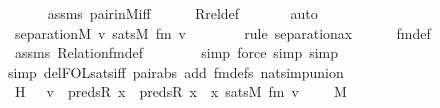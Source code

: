 \begin{isabellebody}
\ \ \ \ \isamarkupfalse%
\ assms\ pair{\isacharunderscore}{\kern0pt}in{\isacharunderscore}{\kern0pt}M{\isacharunderscore}{\kern0pt}iff\isanewline
\ \ \ \ \isamarkupfalse%
\ Rrel{\isacharunderscore}{\kern0pt}def\ \isanewline
\ \ \ \ \isamarkupfalse%
\ auto\isanewline
\ \ \isanewline
\ \ \isamarkupfalse%
\ {\isachardoublequoteopen}separation{\isacharparenleft}{\kern0pt}{\isacharhash}{\kern0pt}{\isacharhash}{\kern0pt}M{\isacharcomma}{\kern0pt}\ {\isasymlambda}v{\isachardot}{\kern0pt}\ sats{\isacharparenleft}{\kern0pt}M{\isacharcomma}{\kern0pt}\ fm{\isacharcomma}{\kern0pt}\ {\isacharbrackleft}{\kern0pt}v{\isacharbrackright}{\kern0pt}\ {\isacharat}{\kern0pt}\ {\isacharbrackleft}{\kern0pt}{\isacharbrackright}{\kern0pt}{\isacharparenright}{\kern0pt}{\isacharparenright}{\kern0pt}{\isachardoublequoteclose}\ \isanewline
\ \ \ \ \isamarkupfalse%
{\isacharparenleft}{\kern0pt}rule\ separation{\isacharunderscore}{\kern0pt}ax{\isacharparenright}{\kern0pt}\isanewline
\ \ \ \ \isamarkupfalse%
\ fm{\isacharunderscore}{\kern0pt}def\isanewline
\ \ \ \ \isamarkupfalse%
\ assms\ Relation{\isacharunderscore}{\kern0pt}fm{\isacharunderscore}{\kern0pt}def\isanewline
\ \ \ \ \ \ \isamarkupfalse%
\ {\isacharparenleft}{\kern0pt}simp{\isacharcomma}{\kern0pt}\ force{\isacharcomma}{\kern0pt}\ simp{\isacharcomma}{\kern0pt}\ simp{\isacharparenright}{\kern0pt}\isanewline
\ \ \ \ \isamarkupfalse%
{\isacharparenleft}{\kern0pt}simp\ del{\isacharcolon}{\kern0pt}FOL{\isacharunderscore}{\kern0pt}sats{\isacharunderscore}{\kern0pt}iff\ pair{\isacharunderscore}{\kern0pt}abs\ add{\isacharcolon}{\kern0pt}\ fm{\isacharunderscore}{\kern0pt}defs\ nat{\isacharunderscore}{\kern0pt}simp{\isacharunderscore}{\kern0pt}union{\isacharparenright}{\kern0pt}\ \ \isanewline
\isanewline
\ \ \isamarkupfalse%
\ \isamarkupfalse%
\ H\ {\isacharcolon}{\kern0pt}\ {\isachardoublequoteopen}{\isacharbraceleft}{\kern0pt}\ v\ {\isasymin}\ preds{\isacharparenleft}{\kern0pt}R{\isacharcomma}{\kern0pt}\ x{\isacharparenright}{\kern0pt}\ {\isasymtimes}\ {\isacharparenleft}{\kern0pt}preds{\isacharparenleft}{\kern0pt}R{\isacharcomma}{\kern0pt}\ x{\isacharparenright}{\kern0pt}\ {\isasymunion}\ {\isacharbraceleft}{\kern0pt}x{\isacharbraceright}{\kern0pt}{\isacharparenright}{\kern0pt}{\isachardot}{\kern0pt}\ sats{\isacharparenleft}{\kern0pt}M{\isacharcomma}{\kern0pt}\ fm{\isacharcomma}{\kern0pt}\ {\isacharbrackleft}{\kern0pt}v{\isacharbrackright}{\kern0pt}\ {\isacharat}{\kern0pt}\ {\isacharbrackleft}{\kern0pt}{\isacharbrackright}{\kern0pt}{\isacharparenright}{\kern0pt}\ {\isacharbraceright}{\kern0pt}\ {\isasymin}\ M{\isachardoublequoteclose}\isanewline

\end{isabellebody}
